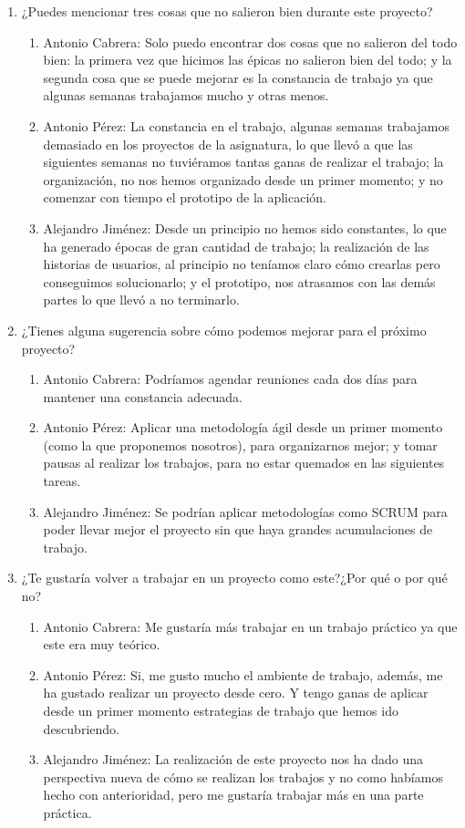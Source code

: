 \begin{enumerate}
        \item ¿Puedes mencionar tres cosas que no salieron bien durante este proyecto?
        \begin{enumerate}
            \item Antonio Cabrera: Solo puedo encontrar dos cosas que no salieron del todo bien: la primera vez que hicimos las épicas no salieron bien del todo; y la segunda cosa que se puede mejorar es la constancia de trabajo ya que algunas semanas trabajamos mucho y otras menos.
            \item Antonio Pérez: La constancia en el trabajo, algunas semanas trabajamos demasiado en los proyectos de la asignatura, lo que llevó a que las siguientes semanas no tuviéramos tantas ganas de realizar el trabajo; la organización, no nos hemos organizado desde un primer momento; y no comenzar con tiempo el prototipo de la aplicación.
            \item Alejandro Jiménez: Desde un principio no hemos sido constantes, lo que ha generado épocas de gran cantidad de trabajo; la realización de las historias de usuarios, al principio no teníamos claro cómo crearlas pero conseguimos solucionarlo; y el prototipo, nos atrasamos con las demás partes lo que llevó a no terminarlo.
        \end{enumerate}

    \item ¿Tienes alguna sugerencia sobre cómo podemos mejorar para el próximo proyecto?
    \begin{enumerate}
        \item Antonio Cabrera: Podríamos agendar reuniones cada dos días para mantener una constancia adecuada.
        \item Antonio Pérez: Aplicar una metodología ágil desde un primer momento (como la que proponemos nosotros), para organizarnos mejor; y tomar pausas al realizar los trabajos, para no estar quemados en las siguientes tareas.
        \item Alejandro Jiménez: Se podrían aplicar metodologías como SCRUM para poder llevar mejor el proyecto sin que haya grandes acumulaciones de trabajo.
    \end{enumerate}
    
    \item ¿Te gustaría volver a trabajar en un proyecto como este?¿Por qué o por qué no?
    \begin{enumerate}
        \item Antonio Cabrera: Me gustaría más trabajar en un trabajo práctico ya que este era muy teórico.
        \item Antonio Pérez: Si, me gusto mucho el ambiente de trabajo, además, me ha gustado realizar un proyecto desde cero. Y tengo ganas de aplicar desde un primer momento estrategias de trabajo que hemos ido descubriendo.
        \item Alejandro Jiménez: La realización de este proyecto nos ha dado una perspectiva nueva de cómo se realizan los trabajos y no como habíamos hecho con anterioridad, pero me gustaría trabajar más en una parte práctica.
 

\end{enumerate}
\end{enumerate}
